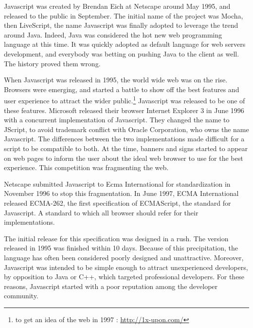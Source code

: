 Javascript was created by Brendan Eich at Netscape around May 1995, and released to the public in September.
The initial name of the project was Mocha, then LiveScript, the name Javascript was finally adopted to leverage the trend around Java.
Indeed, Java was considered the hot new web programming language at this time.
It was quickly adopted as default language for web servers development, and everybody was betting on pushing Java to the client as well.
The history proved them wrong.

When Javascript was released in 1995, the world wide web was on the rise.
Browsers were emerging, and started a battle to show off the best features and user experience to attract the wider public.\footnote{to get an idea of the web in 1997 : \url{http://1x-upon.com/}}
Javascript was released to be one of these features.
Microsoft released their browser Internet Explorer 3 in June 1996 with a concurrent implementation of Javascript.
They changed the name to JScript, to avoid trademark conflict with Oracle Corporation, who owns the name Javascript.
The differences between the two implementations made difficult for a script to be compatible to both.
At the time, banners and signs started to appear on web pages to inform the user about the ideal web browser to use for the best experience.
This competition was fragmenting the web.

Netscape submitted Javascript to Ecma International for standardization in November 1996 to stop this fragmentation.
In June 1997, ECMA International released ECMA-262, the first specification of ECMAScript, the standard for Javascript.
A standard to which all browser should refer for their implementations.

The initial release for this specification was designed in a rush. The version released in 1995 was finished within 10 days.
Because of this precipitation, the language has often been considered poorly designed and unattractive.
Moreover, Javascript was intended to be simple enough to attract unexperienced developers, by opposition to Java or C++, which targeted professional developers.
For these reasons, Javascript started with a poor reputation among the developer community.

